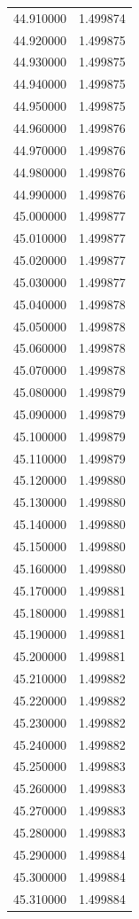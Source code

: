\begin{tabular}{rr}
44.910000 & 1.499874 \\
44.920000 & 1.499875 \\
44.930000 & 1.499875 \\
44.940000 & 1.499875 \\
44.950000 & 1.499875 \\
44.960000 & 1.499876 \\
44.970000 & 1.499876 \\
44.980000 & 1.499876 \\
44.990000 & 1.499876 \\
45.000000 & 1.499877 \\
45.010000 & 1.499877 \\
45.020000 & 1.499877 \\
45.030000 & 1.499877 \\
45.040000 & 1.499878 \\
45.050000 & 1.499878 \\
45.060000 & 1.499878 \\
45.070000 & 1.499878 \\
45.080000 & 1.499879 \\
45.090000 & 1.499879 \\
45.100000 & 1.499879 \\
45.110000 & 1.499879 \\
45.120000 & 1.499880 \\
45.130000 & 1.499880 \\
45.140000 & 1.499880 \\
45.150000 & 1.499880 \\
45.160000 & 1.499880 \\
45.170000 & 1.499881 \\
45.180000 & 1.499881 \\
45.190000 & 1.499881 \\
45.200000 & 1.499881 \\
45.210000 & 1.499882 \\
45.220000 & 1.499882 \\
45.230000 & 1.499882 \\
45.240000 & 1.499882 \\
45.250000 & 1.499883 \\
45.260000 & 1.499883 \\
45.270000 & 1.499883 \\
45.280000 & 1.499883 \\
45.290000 & 1.499884 \\
45.300000 & 1.499884 \\
45.310000 & 1.499884 \\

\end{tabular}
